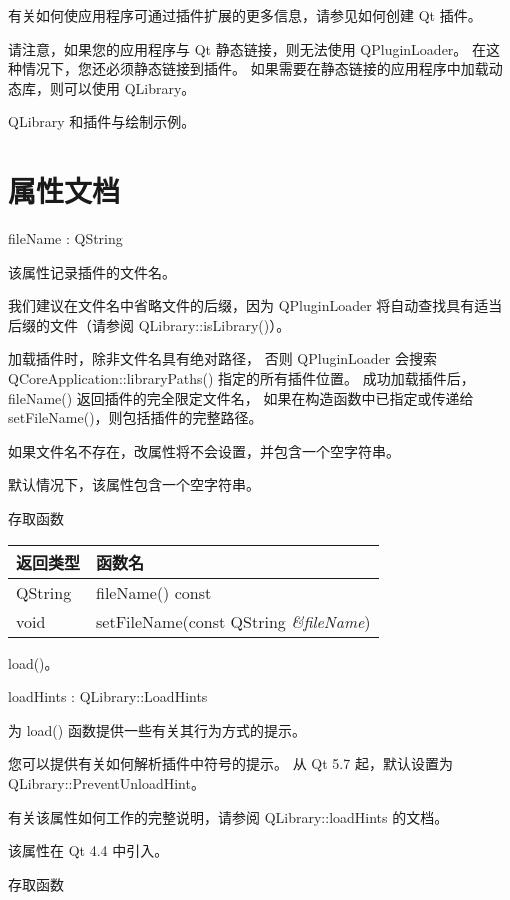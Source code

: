 有关如何使应用程序可通过插件扩展的更多信息，请参见如何创建 Qt 插件。

请注意，如果您的应用程序与 Qt 静态链接，则无法使用 QPluginLoader。
在这种情况下，您还必须静态链接到插件。
如果需要在静态链接的应用程序中加载动态库，则可以使用 QLibrary。

\begin{seeAlso}
QLibrary 和插件与绘制示例。
\end{seeAlso}

\section{属性文档}

fileName : QString

该属性记录插件的文件名。

我们建议在文件名中省略文件的后缀，因为 QPluginLoader 将自动查找具有适当后缀的文件（请参阅 QLibrary::isLibrary()）。

加载插件时，除非文件名具有绝对路径，
否则 QPluginLoader 会搜索 QCoreApplication::libraryPaths() 指定的所有插件位置。
成功加载插件后，fileName() 返回插件的完全限定文件名，
如果在构造函数中已指定或传递给 setFileName()，则包括插件的完整路径。

如果文件名不存在，改属性将不会设置，并包含一个空字符串。

默认情况下，该属性包含一个空字符串。

存取函数


\begin{tabular}{|l|l|}
\hline
返回类型& 	函数名\\
\hline
QString	& fileName() const \\ 
\hline
void	& setFileName(const QString \emph{\&fileName}) \\ 
\hline
\end{tabular}

\begin{seeAlso}
load()。
\end{seeAlso}

loadHints : QLibrary::LoadHints

为 load() 函数提供一些有关其行为方式的提示。

您可以提供有关如何解析插件中符号的提示。
从 Qt 5.7 起，默认设置为 QLibrary::PreventUnloadHint。

有关该属性如何工作的完整说明，请参阅 QLibrary::loadHints 的文档。

该属性在 Qt 4.4 中引入。

存取函数


